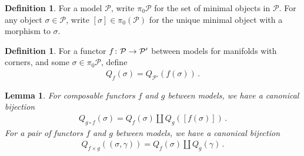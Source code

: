 \documentclass[10pt]{amsart}
\numberwithin{equation}{section}
\newtheorem{lem}[prop]{Lemma}
\theoremstyle{definition}
\newtheorem{definition}[prop]{Definition}
\newcommand{\cP}{\mathcal{P}}
\renewcommand{\to}{\mathchoice{\longrightarrow}{\rightarrow}{}{}}
\begin{document}
\begin{definition}\label{def:pi_0_of_model}
	For a model $\cP$, write $\pi_{0}\cP$ for the set of minimal objects in $\cP$.
	For any object $\sigma \in \cP$, write $[\sigma]\in \pi_{0}(\cP)$ for the unique minimal object with a morphism to $\sigma$.
\end{definition}


\begin{definition}\label{def:Q_f(sigma)}
	For a functor $f\colon \cP\to \cP'$ between models for manifolds with corners, and some $\sigma \in \pi_{0}\cP$, define
	\begin{align*}
		Q_{f}(\sigma) = Q_{\cP'}(f(\sigma)) \,.
	\end{align*}
\end{definition}

\begin{lem}\label{lem:Q_f}
	For composable functors $f$ and $g$ between models, we have a canonical bijection
	\begin{align*}
		Q_{g\circ f}(\sigma) = Q_{f}(\sigma) \amalg Q_{g}([f(\sigma)]) \,.
	\end{align*}
	For a pair of functors $f$ and $g$ between models, we have a canonical bijection
	\begin{align*}
		Q_{f\times g}( (\sigma, \gamma) ) = Q_{f}(\sigma) \amalg Q_{g}(\gamma) \,.
	\end{align*}
\end{lem}
\end{document}
